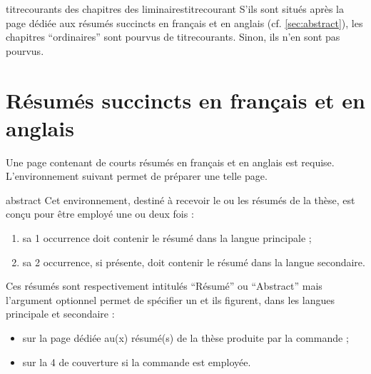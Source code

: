 \begin{dbremark}{\protect\Glspl{titrecourant} des chapitres des \protect\glspl{liminaire}}{titrecourant}
  S'ils sont situés après la page dédiée aux résumés succincts en français et
  en anglais (cf. \vref{sec:abstract}), les chapitres \enquote{ordinaires} sont
  pourvus de \glspl{titrecourant}. Sinon, ils n'en sont pas pourvus.
\end{dbremark}

\section{Résumés succincts en français et en anglais}\label{sec:abstract}

Une page contenant de courts résumés en français et en anglais est requise.
L'environnement  suivant permet de préparer une telle
page.
%
\begin{docEnvironment}[doclang/environment content=résumé,doc description=\mandatory]{abstract}{}
  Cet environnement, destiné à recevoir le ou les résumés de la thèse, est
  conçu pour être employé une ou deux fois :
  \begin{enumerate}
  \item sa 1\iere{} occurrence doit contenir le résumé dans la langue
    principale ;
  \item sa 2\ieme{} occurrence, si présente, doit contenir le résumé dans la
    langue secondaire.
  \end{enumerate}
  Ces résumés sont respectivement intitulés \enquote{Résumé} ou
  \foreignquote{english}{Abstract}\selonlangue{} mais l'argument optionnel
  permet de spécifier un \redefexprcle et ils
  figurent, dans les langues principale et secondaire :
  \begin{itemize}
  \item sur la page dédiée au(x) résumé(s) de la thèse produite par la commande
     ;
  \item sur la 4\ieme{} de couverture si la commande  est
    employée.
  \end{itemize}
\end{docEnvironment}

